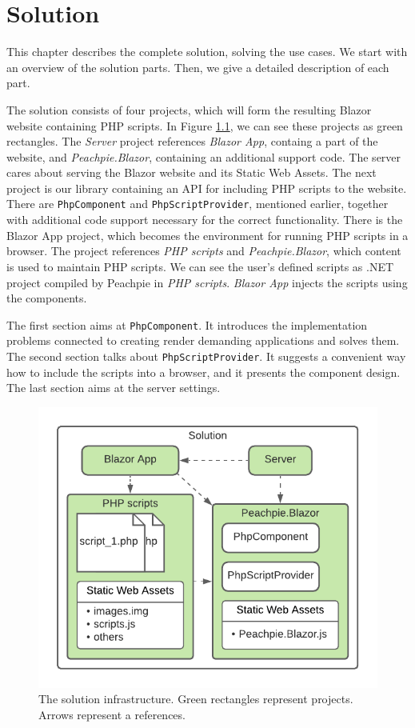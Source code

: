\chapter{Solution}

This chapter describes the complete solution, solving the use cases.
We start with an overview of the solution parts.
Then, we give a detailed description of each part.
\par
The solution consists of four projects, which will form the resulting Blazor website containing PHP scripts.
In Figure \ref{img13:infrastructure}, we can see these projects as green rectangles.
The \textit{Server} project references \textit{Blazor App}, containg a part of the website, and \textit{Peachpie.Blazor}, containing an additional support code.
The server cares about serving the Blazor website and its Static Web Assets.
The next project is our library containing an API for including PHP scripts to the website.
There are \texttt{PhpComponent} and \texttt{PhpScriptProvider}, mentioned earlier, together with additional code support necessary for the correct functionality.
There is the Blazor App project, which becomes the environment for running PHP scripts in a browser.
The project references \textit{PHP scripts} and \textit{Peachpie.Blazor}, which content is used to maintain PHP scripts.
We can see the user's defined scripts as .NET project compiled by Peachpie in \textit{PHP scripts}.
\textit{Blazor App} injects the scripts using the components.
\par
The first section aims at \texttt{PhpComponent}.
It introduces the implementation problems connected to creating render demanding applications and solves them.
The second section talks about \texttt{PhpScriptProvider}.
It suggests a convenient way how to include the scripts into a browser, and it presents the component design.
The last section aims at the server settings.
\par
\begin{figure}[!b]\centering
\includegraphics[scale=0.9]{./img/SolutionInfrastructure}
\caption{The solution infrastructure. Green rectangles represent projects. Arrows represent a references.}
\label{img13:infrastructure}
\end{figure} 


